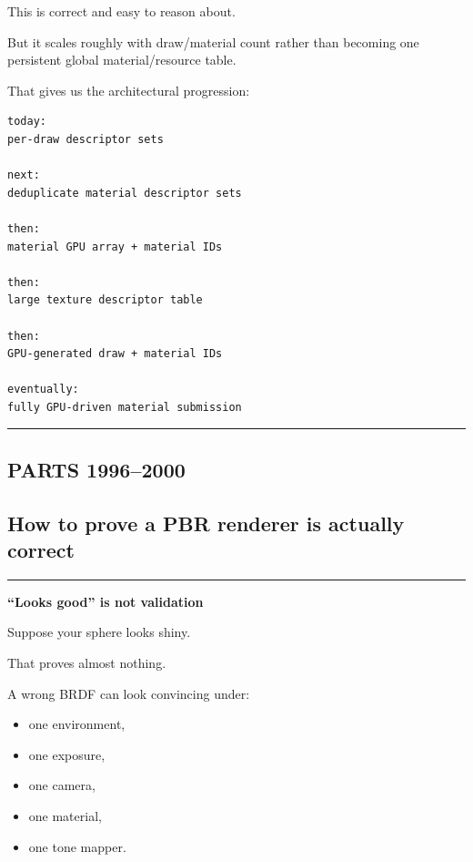 This is correct and easy to reason about.

But it scales roughly with draw/material count rather than becoming one persistent global material/resource table.

That gives us the architectural progression:

\begin{verbatim}
today:
per-draw descriptor sets

next:
deduplicate material descriptor sets

then:
material GPU array + material IDs

then:
large texture descriptor table

then:
GPU-generated draw + material IDs

eventually:
fully GPU-driven material submission
\end{verbatim}

\begin{center}\rule{0.5\linewidth}{0.5pt}\end{center}

\subsection{PARTS 1996--2000}\label{03-visual-computing-i-ch006-parts-19962000}

\subsection{How to prove a PBR renderer is actually correct}\label{03-visual-computing-i-ch006-how-to-prove-a-pbr-renderer-is-actually-correct}

\begin{center}\rule{0.5\linewidth}{0.5pt}\end{center}

\textbf{``Looks good'' is not validation}

Suppose your sphere looks shiny.

That proves almost nothing.

A wrong BRDF can look convincing under:

\begin{itemize}
\tightlist
\item
  one environment,
\item
  one exposure,
\item
  one camera,
\item
  one material,
\item
  one tone mapper.
\end{itemize}

